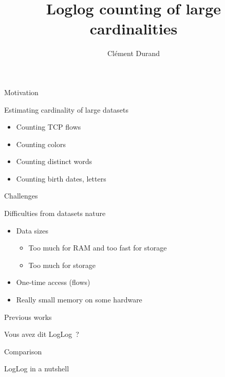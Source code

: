 \documentclass[aspectratio=169]{beamer}
\title[]
      {Loglog counting of large cardinalities}
\author{%
  Cl\'ement Durand%
}
\begin{document}
\maketitle


  \begin{frame}{Motivation}
    \only<+->{\vspace*{.4cm}}
    \begin{center}
      Estimating cardinality of large datasets
    \end{center}\bigskip

    \begin{itemize}[<+-|alert@+>]
      \item Counting TCP flows
      \item Counting colors
      \item Counting distinct words
      \item Counting birth dates, letters
    \end{itemize}
  \end{frame}

  \begin{frame}{Challenges}
    \only<+->{\vspace*{.4cm}}
    \begin{center}
      Difficulties from datasets nature
    \end{center}\bigskip

    \begin{itemize}[<+-|alert@+>]
      \item Data sizes
        \begin{itemize}
          \item Too much for RAM and too fast for storage
          \item Too much for storage
        \end{itemize}
      \item One-time access (flows)
      \item Really small memory on some hardware
    \end{itemize}
  \end{frame}

  \begin{frame}{Previous works}
  \end{frame}


  \begin{frame}{Vous avez dit LogLog~?}
  \end{frame}

  \begin{frame}{Comparison}
  \end{frame}


  \begin{frame}{LogLog in a nutshell}
  \end{frame}
\end{document}
